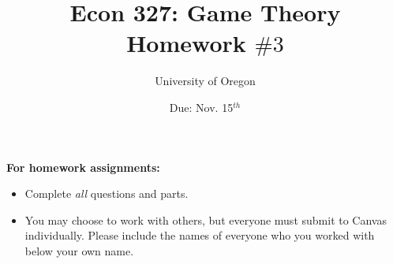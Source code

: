 \documentclass[addpoints ]{exam}
\title{
    \textbf{Econ 327: Game Theory} \\ 
    Homework $\#3$
    }
\author{University of Oregon}
\date{Due: Nov. 15$^{th}$}
\begin{document}
\maketitle

\begin{center}
  \gradetable[h][questions]
\end{center}

\vspace{0.5in}

\begin{center}
  \textbf{For homework assignments:}
\end{center}

\begin{itemize}


  \item Complete \textit{all} questions and parts.

  \item You may choose to work with others,
  but everyone must submit to Canvas individually.
  Please include the names of everyone who you worked with 
  below your own name.
 
\end{itemize}

\vspace{1.0in}


\vspace{0.5in}

\begin{center}
\end{center}

\newpage
\end{document}
